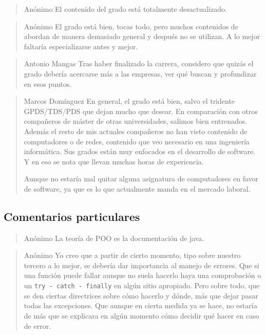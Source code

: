 \begin{quote}{Anónimo}
    El contenido del grado está totalmente desactualizado.
\end{quote}

\begin{quote}{Anónimo}
    El grado está bien, tocas todo,
    pero muchos contenidos de abordan de manera demasiado general y
    después no se utilizan.
    A lo mejor faltaría especializarse antes y mejor.
\end{quote}

\begin{quote}{Antonio Mangas}
    Tras haber finalizado la carrera,
    considero que quizás el grado debería acercarse más a las empresas,
    ver qué buscan y profundizar en esos puntos.
\end{quote}

\begin{quote}{Marcos Domínguez}\label{qte:marcos-contents}
    En general, el grado está bien,
    salvo el tridente GPDS/TDS/PDS que dejan mucho que desear.
    En comparación con otros compañeros de máster de otras universidades,
    salimos bien entrenados.
    Además el resto de mis actuales compañeros no han visto
    contenido de computadores o de redes,
    contenido que veo necesario en una ingeniería informática.
    Sus grados están muy enfocados en el desarrollo de software.
    Y en eso se nota que llevan muchas horas de experiencia.

    Aunque no estaría mal quitar alguna asignatura de computadores
    en favor de software,
    ya que es lo que actualmente manda en el mercado laboral.
\end{quote}

\subsection{Comentarios particulares}

\begin{quote}{Anónimo}
    La teoría de POO es la documentación de java.
\end{quote}

\begin{quote}{Anónimo}
    Yo creo que a partir de cierto momento,
    tipo sobre nuestro tercero a lo mejor,
    se debería dar importancia al manejo de errores.
    Que si una función puede fallar aunque no suela hacerlo
    haya una comprobación o un \lstinline{try - catch - finally}
    en algún sitio apropiado.
    Pero sobre todo, que se den ciertas directrices sobre cómo hacerlo y dónde,
    más que dejar pasar todas las excepciones.
    Que aunque en cierta medida ya se hace, no estaría de más que
    se explicara en algún momento cómo decidir qué hacer en caso de error.
\end{quote}

